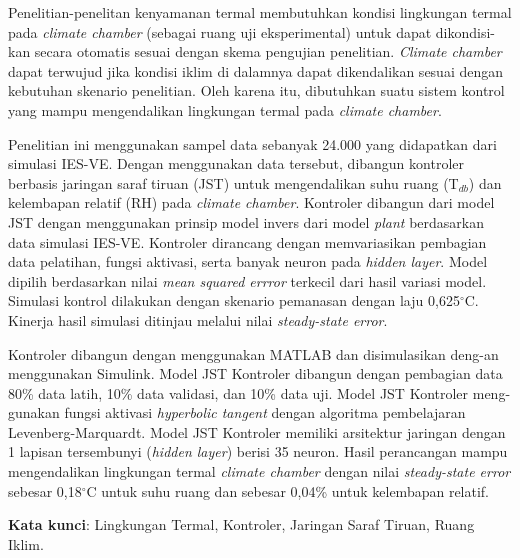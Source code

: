 Penelitian-penelitan kenyamanan termal membutuhkan kondisi lingkungan termal pada \textit{climate chamber} (sebagai ruang uji eksperimental) untuk dapat dikondisi-kan secara otomatis sesuai dengan skema pengujian penelitian. \textit{Climate chamber} dapat terwujud jika kondisi iklim di dalamnya dapat dikendalikan sesuai dengan kebutuhan skenario penelitian. Oleh karena itu, dibutuhkan suatu sistem kontrol yang mampu mengendalikan lingkungan termal pada \textit{climate chamber}.

Penelitian ini menggunakan sampel data sebanyak 24.000 yang didapatkan dari simulasi IES-VE. Dengan menggunakan data tersebut, dibangun kontroler berbasis jaringan saraf tiruan (JST) untuk mengendalikan suhu ruang (T$_{db}$) dan kelembapan relatif (RH) pada \textit{climate chamber}. Kontroler dibangun dari model JST dengan menggunakan prinsip model invers dari model \textit{plant} berdasarkan data simulasi IES-VE. Kontroler dirancang dengan memvariasikan pembagian data pelatihan, fungsi aktivasi, serta banyak neuron pada \textit{hidden layer}. Model dipilih berdasarkan nilai \textit{mean squared errror} terkecil dari hasil variasi model. Simulasi kontrol dilakukan dengan skenario pemanasan dengan laju 0,625$^\circ$C. Kinerja hasil simulasi ditinjau melalui nilai \textit{steady-state error}.

Kontroler dibangun dengan menggunakan MATLAB dan disimulasikan deng-an menggunakan Simulink. Model JST Kontroler dibangun dengan pembagian data 80\% data latih, 10\% data validasi, dan 10\% data uji. Model JST Kontroler meng-gunakan fungsi aktivasi \textit{hyperbolic tangent} dengan algoritma pembelajaran Levenberg-Marquardt. Model JST Kontroler memiliki arsitektur jaringan dengan 1 lapisan tersembunyi (\textit{hidden layer}) berisi 35 neuron. Hasil perancangan mampu mengendalikan lingkungan termal \textit{climate chamber} dengan nilai \textit{steady-state error} sebesar 0,18$^\circ$C untuk suhu ruang dan sebesar 0,04\% untuk kelembapan relatif.

\vspace{0.4cm}
\hspace{-1.2cm}
\textbf{Kata kunci}: Lingkungan Termal, Kontroler, Jaringan Saraf Tiruan, Ruang Iklim.

